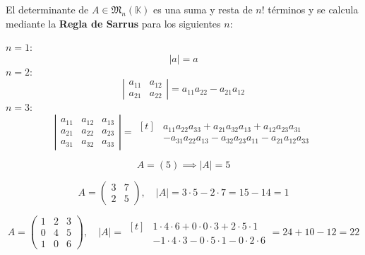 \documentclass[a4paper,12pt]{article}
\begin{document}
\begin{procedimiento}[title=Cálculo de determinantes]
El determinante de $A \in \mathfrak{M}_n(\mathbb{K})$ es una suma y resta de $n!$ términos y se calcula mediante la \textbf{Regla de Sarrus} para los siguientes $n$:

\vspace{0.5em}

\textbf{$n = 1$}: 
\[
|a| = a
\]
\textbf{$n = 2$}: 
\[
\left|\begin{array}{cc}
a_{11} & a_{12} \\
a_{21} & a_{22}
\end{array}\right|= a_{11} a_{22} - a_{21} a_{12}
\]
\textbf{$n = 3$}:
\[
\left|\begin{array}{ccc}
a_{11} & a_{12} & a_{13} \\
a_{21} & a_{22} & a_{23} \\
a_{31} & a_{32} & a_{33}
\end{array}\right|
=
\begin{aligned}[t]
& a_{11}a_{22}a_{33} + a_{21}a_{32}a_{13} + a_{12}a_{23}a_{31} \\
& - a_{31}a_{22}a_{13} - a_{32}a_{23}a_{11} - a_{21}a_{12}a_{33}
\end{aligned}
\]


\end{procedimiento}

\begin{ejemplo}[title=Ejemplos de determinantes]
    \[
    A = (5) \implies |A| = 5
    \]

    \[
    A =
    \begin{pmatrix}
    3 & 7 \\
    2 & 5
    \end{pmatrix}, \quad
    |A| = 3\cdot 5 - 2\cdot 7 = 15 - 14 = 1
    \]

    \[
    A =
    \begin{pmatrix}
    1 & 2 & 3 \\
    0 & 4 & 5 \\
    1 & 0 & 6
    \end{pmatrix}, \quad
    |A| =
    \begin{aligned}[t]
    & 1\cdot 4 \cdot 6 + 0\cdot 0 \cdot 3 + 2\cdot 5 \cdot 1 \\
    & - 1\cdot 4 \cdot 3 - 0\cdot 5 \cdot 1 - 0\cdot 2 \cdot 6
    \end{aligned}
    = 24 + 10 - 12 = 22
    \]
\end{ejemplo}
\end{document}
